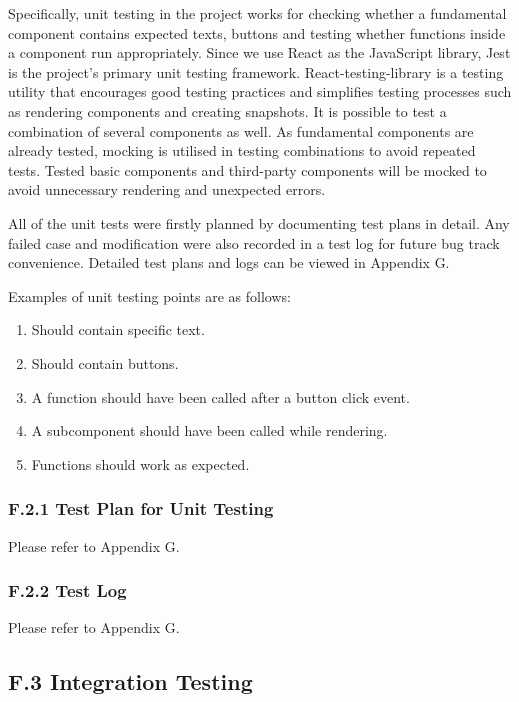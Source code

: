 \documentclass[
]{article}
\begin{document}
Specifically, unit testing in the project works for checking whether a
fundamental component contains expected texts, buttons and testing
whether functions inside a component run appropriately. Since we use
React as the JavaScript library, Jest is the project's primary unit
testing framework. React-testing-library is a testing utility that
encourages good testing practices and simplifies testing processes such
as rendering components and creating snapshots. It is possible to test a
combination of several components as well. As fundamental components are
already tested, mocking is utilised in testing combinations to avoid
repeated tests. Tested basic components and third-party components will
be mocked to avoid unnecessary rendering and unexpected errors.

All of the unit tests were firstly planned by documenting test plans in
detail. Any failed case and modification were also recorded in a test
log for future bug track convenience. Detailed test plans and logs can
be viewed in Appendix G.

Examples of unit testing points are as follows:

\begin{enumerate}
\def\labelenumi{\arabic{enumi}.}
\item
  Should contain specific text.
\item
  Should contain buttons.
\item
  A function should have been called after a button click event.
\item
  A subcomponent should have been called while rendering.
\item
  Functions should work as expected.
\end{enumerate}

\hypertarget{header-n21}{%
\subsubsection{F.2.1 Test Plan for Unit Testing}\label{header-n21}}

Please refer to Appendix G.

\hypertarget{header-n23}{%
\subsubsection{F.2.2 Test Log}\label{header-n23}}

Please refer to Appendix G.

\hypertarget{header-n26}{%
\subsection{F.3 Integration Testing}\label{header-n26}}
\end{document}
